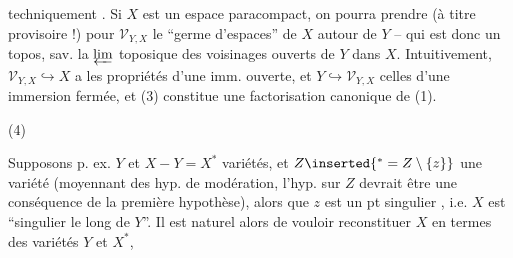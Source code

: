 
techniquement . Si $X$ est un  espace paracompact, on pourra prendre (à titre provisoire !) pour $\mathcal V_{Y,X}$ le ``germe d'espaces'' de $X$ autour de $Y$ -- qui est donc un topos, sav. la $\varprojlim$ toposique des voisinages ouverts de $Y$ dans $X$. Intuitivement, $\mathcal V_{Y,X}\hookrightarrow X$ a les propriétés d'une imm. ouverte, et $Y\hookrightarrow\mathcal V_{Y,X}$ celles d'une immersion fermée, et (3) constitue une factorisation canonique de (1).



(4)

Supposons p. ex. $Y$ et $X-Y=X^*$  variétés, et $Z\inserted{{}^*=Z\setminus\{z\}}$ une variété (moyennant des hyp. de modération, l'hyp. sur $Z$ devrait être une conséquence de la première hypothèse),  alors que $z$ est un pt singulier , i.e. $X$ est ``singulier le long de $Y$''. Il est naturel alors de vouloir reconstituer $X$ en termes des variétés $Y$ et $X^*$,

